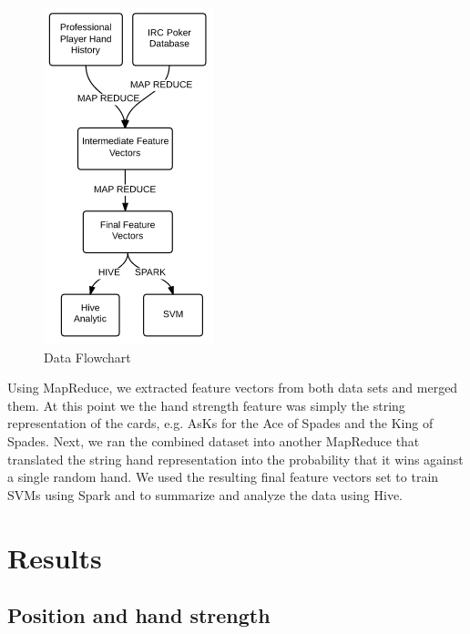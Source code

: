 \documentclass[twoside]{article}
\begin{document}
\begin{multicols}{2}
\begin{figure}[H]
  \centering
  \centerline{\includegraphics[width=0.5\columnwidth]{Flowchart.png}}
   \caption{Data Flowchart}
  \label{fig:Data flow}
\end{figure}

Using MapReduce, we extracted feature vectors from both data sets and merged them. At this point we the hand strength feature was simply the string representation of the cards, e.g. AsKs for the Ace of Spades and the King of Spades. Next, we ran the combined dataset into another MapReduce that translated the string hand representation into the probability that it wins against a single random hand. We used the resulting final feature vectors set to train SVMs using Spark and to summarize and analyze the data using Hive. 


\section{Results}

\subsection{Position and hand strength}


\end{multicols}
\end{document}
